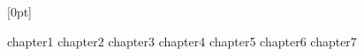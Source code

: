 \documentclass{report}
\begin{document}




  [0pt]
  {\addvspace{1em}}
  {\bfseries\chaptername\ \thecontentslabel\quad}
  {}
  {\bfseries\hfill\contentspage}
\tableofcontents


\newpage

\newpage
{}
{chapter1}
{chapter2}
{chapter3}
{chapter4}
{chapter5}
{chapter6}
{chapter7}
\end{document}
